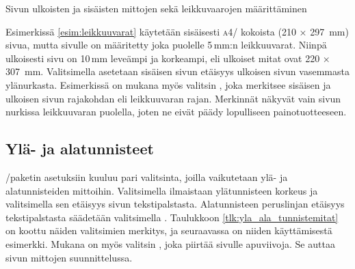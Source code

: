 \begin{esimerkki*}
\begin{koodilohko}
\end{koodilohko}
  \caption{Sivun ulkoisten ja sisäisten mittojen sekä leikkuvaarojen
    määrittäminen}
  \label{esim:leikkuuvarat}
\end{esimerkki*}

Esimerkissä \ref{esim:leikkuuvarat} käytetään sisäisesti \textsc{a4}\-/
kokoista (210 × 297~mm) sivua, mutta sivulle on määritetty joka puolelle
5\,mm:n leikkuuvarat. Niinpä ulkoisesti sivu on 10\,mm leveämpi ja
korkeampi, eli ulkoiset mitat ovat 220 × 307~mm. Valitsimella
 asetetaan sisäisen sivun etäisyys ulkoisen sivun
vasemmasta ylänurkasta. Esimerkissä on mukana myös valitsin
, joka merkitsee sisäisen ja ulkoisen sivun rajakohdan
eli leikkuuvaran rajan. Merkinnät näkyvät vain sivun nurkissa
leikkuuvaran puolella, joten ne eivät päädy lopulliseen
painotuotteeseen.

\subsection{Ylä- ja alatunnisteet}
\label{luku:yla_ala_tunnisteet}

\-/paketin asetuksiin kuuluu pari valitsinta, joilla
vaikutetaan ylä- ja alatunnisteiden mittoihin. Valitsimella 
ilmaistaan ylätunnisteen korkeus ja valitsimella  sen
etäisyys sivun tekstipalstasta. Alatunnisteen peruslinjan etäisyys
tekstipalstasta säädetään valitsimella . Taulukkoon
\ref{tlk:yla_ala_tunnistemitat} on koottu näiden valitsimien merkitys,
ja seuraavassa on niiden käyttämisestä esimerkki. Mukana on myös
valitsin , joka piirtää sivulle apuviivoja. Se auttaa
sivun mittojen suunnittelussa.

\begin{koodilohkosis}
\geometry{head=24bp, headsep=8bp, footskip=12mm, showframe}
\end{koodilohkosis}



